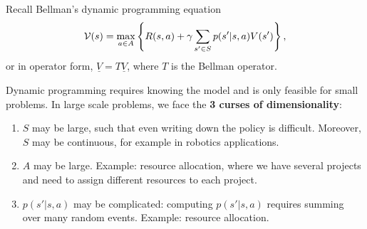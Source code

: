 %
\usetikzlibrary{calc}
\usetikzlibrary{shapes,arrows}
%
%
%
%
%
%
%
%

\newcommand{\weights}{\texttt{w}}
\newcommand{\ftrs}{\phi}
\newcommand{\FtrMtx}{\Phi}


Recall Bellman's dynamic programming equation
$$\mathcal{V}(s) = \max_{a \in A} \left\{R(s,a) + \gamma \sum_{s' \in S} p(s'|s,a)V(s')\right\},$$
or in operator form, $\underline{V}=T\underline{V}$, where $T$ is the Bellman operator.

Dynamic programming requires knowing the model and is only feasible for small problems.
In large scale problems, we face the \textbf{3 curses of dimensionality}:

\begin{enumerate}
\item $S$ may be large, such that even writing down the policy is difficult. Moreover, $S$ may be continuous, for example in robotics applications.
\item $A$ may be large. Example: resource allocation, where we have several projects and need to assign different resources to each project.
\item $p(s'|s,a)$ may be complicated: computing $p(s'|s,a)$ requires summing over many random events. Example: resource allocation.
\end{enumerate}


